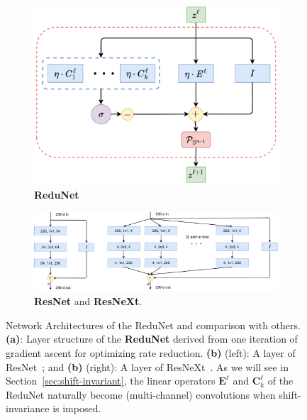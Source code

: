 \documentclass[../../book-main.tex]{subfiles}
\begin{document}
\begin{figure}[t]
    \begin{subfigure}[t]{0.35\textwidth}
        \centering
        \includegraphics[width=\textwidth]{figs_chap4/redunet_layer.png}
        \caption{\textbf{ReduNet}}
    \end{subfigure}
    \hfill 
    \begin{subfigure}[t]{0.6\textwidth}
        \centering
        \includegraphics[width=\textwidth]{figs_chap4/resnet_resnext.pdf}
        \caption{\textbf{ResNet} and \textbf{ResNeXt}.}
    \end{subfigure}
    \caption{\small Network Architectures of the ReduNet and comparison with others. \textbf{(a)}: Layer structure of the \textbf{ReduNet} derived from one iteration of gradient ascent for optimizing rate reduction. \textbf{(b)} (left): A layer of ResNet~\cite{he2016deep}; and \textbf{(b)} (right): A layer of ResNeXt~\cite{ResNEXT}. As we will see in Section~\ref{sec:shift-invariant}, the linear operators $\bm E^\ell$ and $\bm{C}_k^\ell$ of the ReduNet naturally become (multi-channel) convolutions when shift-invariance is imposed.}
    \label{fig:arch-ReduNet}
\end{figure}
\end{document}
